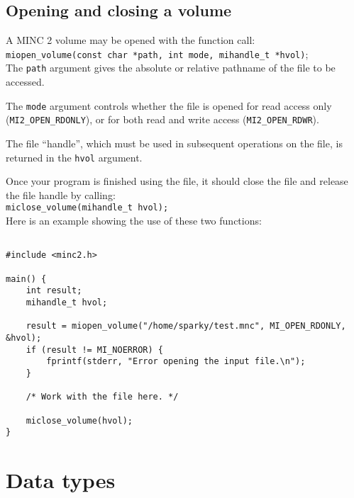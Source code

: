 \documentclass{article}
\begin{document}
\subsection{Opening and closing a volume}
A MINC 2 volume may be opened with the function call: \\

{\tt miopen\_volume(const char *path, int mode, mihandle\_t *hvol)}; \\

The {\tt path} argument gives the absolute or relative pathname of the
file to be accessed.

The {\tt mode} argument controls whether the file is opened for read
access only ({\tt MI2\_OPEN\_RDONLY}), or for both read and write access
({\tt MI2\_OPEN\_RDWR}). 

The file ``handle'', which must be used in subsequent operations on the
file, is returned in the {\tt hvol} argument.

Once your program is finished using the file, it should close the file
and release the file handle by calling:\\

{\tt miclose\_volume(mihandle\_t hvol);} \\

Here is an example showing the use of these two functions:

\begin{verbatim}

#include <minc2.h>

main() {
    int result;
    mihandle_t hvol;

    result = miopen_volume("/home/sparky/test.mnc", MI_OPEN_RDONLY, &hvol);
    if (result != MI_NOERROR) {
        fprintf(stderr, "Error opening the input file.\n");
    }

    /* Work with the file here. */

    miclose_volume(hvol);
}
\end{verbatim}

\newpage
\section{Data types}
\end{document}
